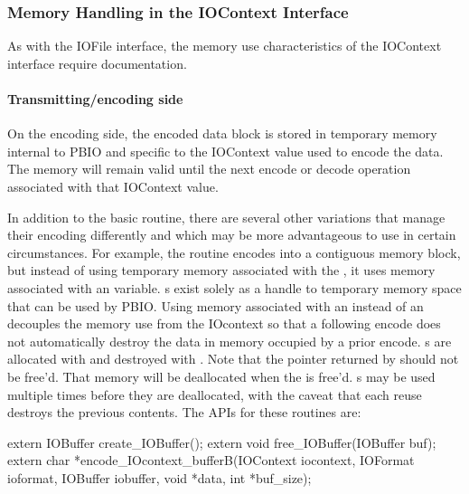 \subsubsection{Memory Handling in the IOContext Interface}

As with the IOFile interface, the memory use characteristics of the IOContext
interface require documentation.  

\paragraph{Transmitting/encoding side}
On the encoding side, the encoded data block is stored in temporary memory
internal to PBIO and specific to the IOContext value used to encode the data.
The memory will remain valid until the next encode or decode operation
associated with that IOContext value.  

In addition to the basic  routine,
there are several other variations that manage their encoding differently
and which may be more advantageous to use in certain circumstances.  For
example, the routine  encodes into a
contiguous memory block, but instead of using temporary memory associated
with the , it uses memory associated with an
 variable.  s exist solely as a handle
to temporary memory space that can be used by PBIO.  Using memory associated
with an  instead of an  decouples the
memory use from the IOcontext so that a following encode does not
automatically destroy the data in memory occupied by a prior encode.
s are allocated with  and
destroyed with .  Note that the pointer returned
by  should not be free'd.  That memory
will be deallocated when the  is free'd.
s may be used multiple times before they are deallocated,
with the caveat that each reuse destroys the previous contents.
The APIs for these routines are:
\begin{WrapCode}
extern IOBuffer create_IOBuffer();
extern void free_IOBuffer(IOBuffer buf);
extern char *encode_IOcontext_bufferB(IOContext iocontext, IOFormat ioformat, IOBuffer iobuffer, 
                                      void *data, int *buf_size);
\end{WrapCode}

